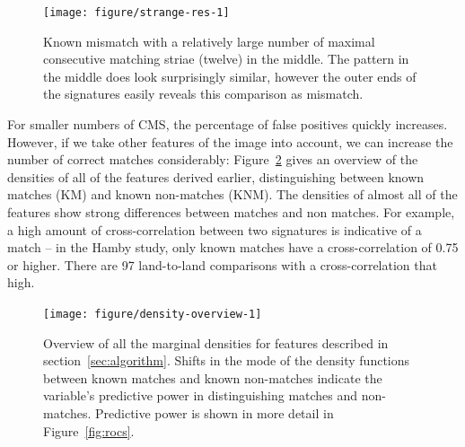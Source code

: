 \documentclass[aoas, preprint]{imsart}\usepackage[]{graphicx}\usepackage[]{color}
\newenvironment{knitrout}{}{} %
\begin{document}
\begin{figure}[hbtp]
  \centering
\begin{knitrout}
\color{fgcolor}
\texttt{[image: figure/strange-res-1]} 

\end{knitrout}
\caption{\label{fig:mismatch}Known mismatch with a relatively large number of maximal consecutive matching striae (twelve) in the middle. The pattern in the middle does look surprisingly similar, however the outer ends of the signatures easily reveals this comparison as mismatch. }
\end{figure}

For smaller numbers of CMS, the percentage of false positives quickly increases. However, if we take other features of the image into account, we can increase the number of correct matches considerably: Figure~\ref{fig:densities} gives an overview of the densities of all of the features derived earlier, distinguishing between known matches (KM) and known non-matches (KNM). The densities of almost all of the features show strong differences between matches and non matches. For example, a high amount of cross-correlation between two signatures is indicative of a match --  in the Hamby study, only known matches have a cross-correlation of 0.75 or higher. There are 97 land-to-land comparisons with a cross-correlation that high.

\begin{figure}[hbtp]
  \centering
\begin{knitrout}
\color{fgcolor}
\texttt{[image: figure/density-overview-1]} 

\end{knitrout}
\caption{\label{fig:densities}Overview of all the marginal densities for features described in section~\ref{sec:algorithm}. Shifts in the mode of the density functions between known matches and known non-matches indicate the variable's predictive power in distinguishing matches and non-matches. Predictive power is shown in more detail in Figure~\ref{fig:rocs}.}
\end{figure}
\end{document}
